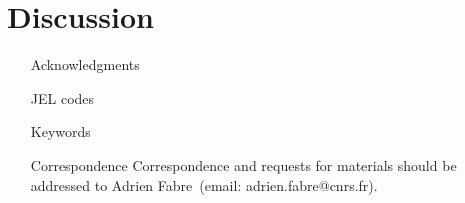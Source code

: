 \documentclass[12pt,english]{article}
\begin{document}


\section{Discussion\label{sec:conclusion}} 

  \begin{small} %

\end{small}  %


\renewcommand{\url}[1]{\href{#1}{Link}} %

%  

\begin{itemize}
\item[Acknowledgments] %
\item[JEL codes] 
\item[Keywords]  
\item[Correspondence] Correspondence and requests for materials should be addressed to Adrien Fabre~(email: adrien.fabre@cnrs.fr).
\end{itemize}
\end{document}
